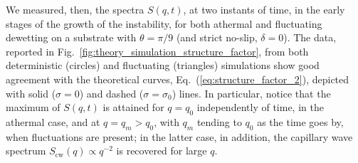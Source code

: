 We measured, then, the spectra $S(q,t)$, at two instants of time, in the early stages of the growth of the instability, for both athermal and fluctuating dewetting on a substrate with $\theta=\pi/9$ (and strict no-slip, $\delta=0$).
The data, reported in Fig.~\ref{fig:theory_simulation_structure_factor}, from both deterministic (circles) and fluctuating (triangles) simulations show good agreement with the theoretical curves, Eq.~(\ref{eq:structure_factor_2}), depicted with solid ($\sigma=0$) and dashed ($\sigma=\sigma_0$) lines.
In particular, notice that the maximum of $S(q,t)$ is attained for $q=q_0$ independently of time, in the athermal case, and at $q = q_m > q_0$, with $q_m$ tending to $q_0$ as the time goes by, when fluctuations are present; in the latter case, in addition, the capillary wave spectrum $S_{\text{cw}}(q) \propto q^{-2}$ is recovered for large $q$.

